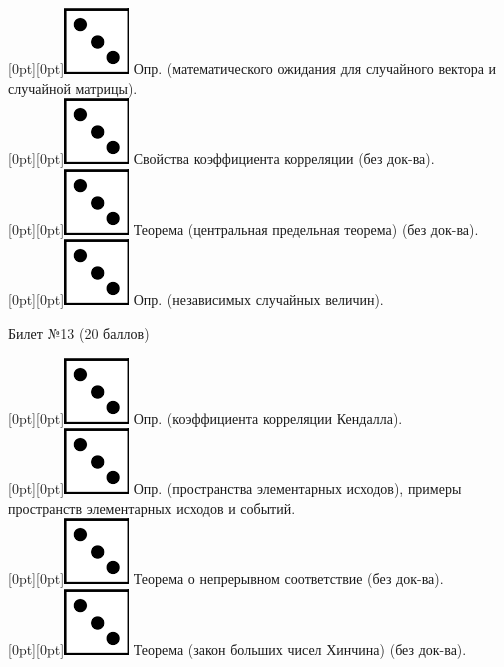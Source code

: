 \documentclass[10pt]{article}
\begin{document}
\raisebox{-1pt}[0pt][0pt]{\includegraphics[width=0.02\linewidth]{3.png}} Опр. (математического ожидания для случайного вектора и случайной матрицы). \\

\raisebox{-1pt}[0pt][0pt]{\includegraphics[width=0.02\linewidth]{3.png}} Свойства коэффициента корреляции (без док-ва). \\

\raisebox{-1pt}[0pt][0pt]{\includegraphics[width=0.02\linewidth]{3.png}} Теорема (центральная предельная теорема) (без док-ва). \\

\raisebox{-1pt}[0pt][0pt]{\includegraphics[width=0.02\linewidth]{3.png}} Опр. (независимых случайных величин). \\

\begin{center} {\Large Билет №13 (20 баллов)} \end{center}

\raisebox{-1pt}[0pt][0pt]{\includegraphics[width=0.02\linewidth]{3.png}} Опр. (коэффициента корреляции Кендалла). \\

\raisebox{-1pt}[0pt][0pt]{\includegraphics[width=0.02\linewidth]{3.png}} Опр. (пространства элементарных исходов), примеры пространств элементарных исходов и событий. \\

\raisebox{-1pt}[0pt][0pt]{\includegraphics[width=0.02\linewidth]{3.png}} Теорема о непрерывном соответствие (без док-ва). \\

\raisebox{-1pt}[0pt][0pt]{\includegraphics[width=0.02\linewidth]{3.png}} Теорема (закон больших чисел Хинчина) (без док-ва). \\
\end{document}
